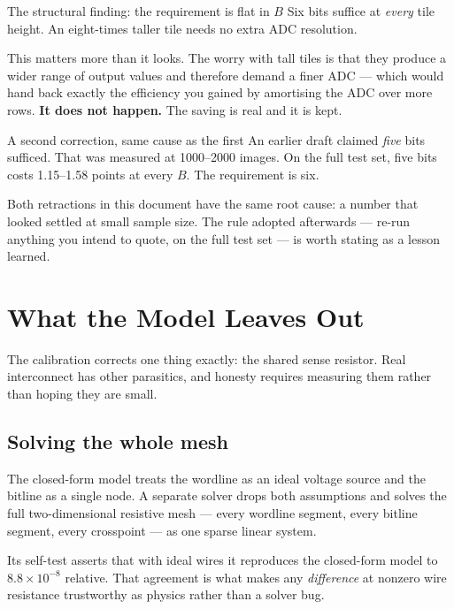 \documentclass[11pt,a4paper]{report}
\begin{document}
\begin{keybox}{The structural finding: the requirement is flat in $B$}
Six bits suffice at \emph{every} tile height. An eight-times taller tile needs
no extra ADC resolution.

This matters more than it looks. The worry with tall tiles is that they
produce a wider range of output values and therefore demand a finer ADC ---
which would hand back exactly the efficiency you gained by amortising the ADC
over more rows. \textbf{It does not happen.} The saving is real and it is
kept.
\end{keybox}

\begin{warnbox}{A second correction, same cause as the first}
An earlier draft claimed \emph{five} bits sufficed. That was measured at
1000--2000 images. On the full test set, five bits costs 1.15--1.58 points at
every $B$. The requirement is six.

Both retractions in this document have the same root cause: a number that
looked settled at small sample size. The rule adopted afterwards --- re-run
anything you intend to quote, on the full test set --- is worth stating as a
lesson learned.
\end{warnbox}


\chapter{What the Model Leaves Out}
\label{ch:wire}

The calibration corrects one thing exactly: the shared sense resistor. Real
interconnect has other parasitics, and honesty requires measuring them rather
than hoping they are small.

\section{Solving the whole mesh}

The closed-form model treats the wordline as an ideal voltage source and the
bitline as a single node. A separate solver drops both assumptions and solves
the full two-dimensional resistive mesh --- every wordline segment, every
bitline segment, every crosspoint --- as one sparse linear system.

Its self-test asserts that with ideal wires it reproduces the closed-form
model to $8.8\times10^{-8}$ relative. That agreement is what makes any
\emph{difference} at nonzero wire resistance trustworthy as physics rather
than a solver bug.
\end{document}
